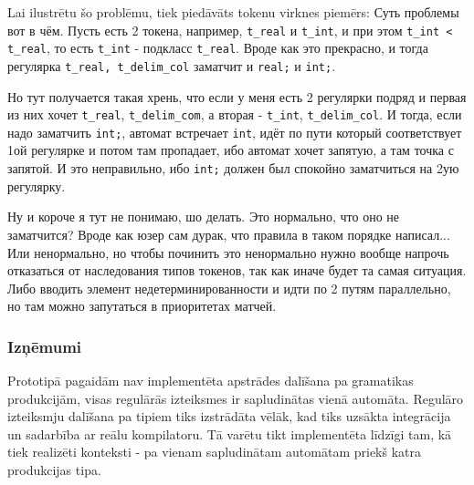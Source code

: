 Lai ilustrētu šo problēmu, tiek piedāvāts tokenu virknes piemērs:
Суть проблемы вот в чём. Пусть есть 2 токена, например, \verb|t_real| и \verb|t_int|, и при этом \verb|t_int < t_real|, то есть \verb|t_int| - подкласс \verb|t_real|. Вроде как это прекрасно, и тогда регулярка \verb|t_real, t_delim_col| заматчит и \verb|real;| и \verb|int;|.

Но тут получается такая хрень, что если у меня есть 2 регулярки подряд и первая из них хочет \verb|t_real|, \verb|t_delim_com|, а вторая - \verb|t_int|, \verb|t_delim_col|. И тогда, если надо заматчить \verb|int;|, автомат встречает \verb|int|, идёт по пути который соответствует 1ой регулярке и потом там пропадает, ибо автомат хочет запятую, а там точка с запятой. И это неправильно, ибо \verb|int;| должен был спокойно заматчиться на 2ую регулярку.

Ну и короче я тут не понимаю, шо делать. Это нормально, что оно не заматчится? Вроде как юзер сам дурак, что правила в таком порядке написал... Или ненормально, но чтобы починить это ненормально нужно вообще напрочь отказаться от наследования типов токенов, так как иначе будет та самая ситуация. Либо вводить элемент недетерминированности и идти по 2 путям параллельно, но там можно запутаться в приоритетах матчей.

\subsubsection{Izņēmumi}
Prototipā pagaidām nav implementēta apstrādes dalīšana pa gramatikas produkcijām, visas regulārās izteiksmes ir sapludinātas vienā automāta. Regulāro izteiksmju dalīšana pa tipiem tiks izstrādāta vēlāk, kad tiks uzsākta integrācija un sadarbība ar reālu kompilatoru. Tā varētu tikt implementēta līdzīgi tam, kā tiek realizēti konteksti - pa vienam sapludinātam automātam priekš katra produkcijas tipa.